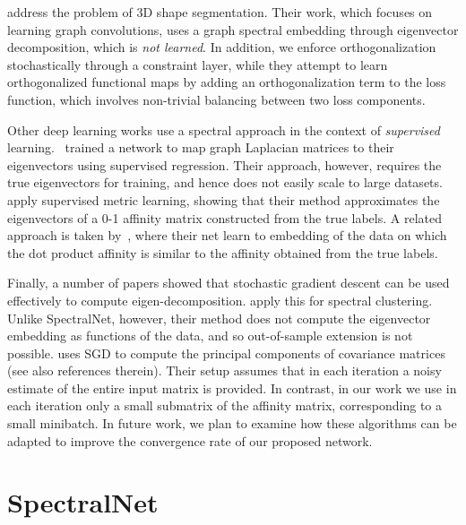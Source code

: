 \documentclass{article} %
\begin{document}
\citet{yi2016syncspeccnn} address the problem of 3D shape segmentation. Their work, which focuses on learning graph convolutions, uses a graph spectral embedding through eigenvector decomposition, which is \textit{not learned}. In addition,  we enforce orthogonalization stochastically through a constraint layer, while they attempt to learn orthogonalized functional maps by adding an orthogonalization term to the loss function, which involves non-trivial balancing between two loss components.

Other deep learning works use a spectral approach in the context of  \textit{supervised} learning.~\citet{mishne2017diffusion} trained a network to map graph Laplacian matrices to their eigenvectors using supervised regression. Their approach, however, requires the true eigenvectors for training, and hence does not easily scale to large datasets. 
\citet{law2017deep} apply supervised metric learning, showing that their method approximates the eigenvectors of a 0-1 affinity matrix constructed from the true labels. 
A related approach is taken by~\citet{hershey2016deep}, where their net learn to embedding of the data on which the dot product affinity is similar to the affinity obtained from the true labels. 

Finally, a number of papers showed that stochastic gradient descent can be used effectively to compute eigen-decomposition. 
\citet{han2017mini} apply this for spectral clustering. Unlike SpectralNet, however, their method does not compute the eigenvector embedding as functions of the data, and so out-of-sample extension is not possible. 
\citet{shamir2015stochastic} uses SGD to compute the principal components of covariance matrices (see also references therein). Their setup assumes that in each iteration a noisy estimate of the entire input matrix is provided. In contrast, in our work we use in each iteration only a small submatrix of the affinity matrix, corresponding to a small minibatch. In future work, we plan to examine how these algorithms can be adapted to improve the convergence rate of our proposed network.


\section {SpectralNet}\label{sec:spectralNet}
\end{document}
